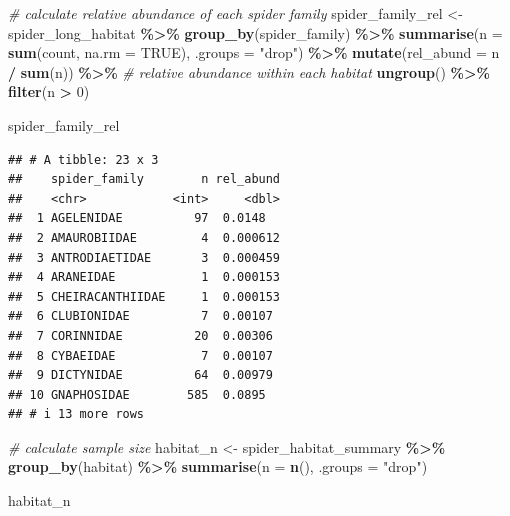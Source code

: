 \documentclass[
]{article}
\newenvironment{Shaded}{\begin{snugshade}}{\end{snugshade}}
\newcommand{\AttributeTok}[1]{\textcolor[rgb]{0.13,0.29,0.53}{#1}}
\newcommand{\CommentTok}[1]{\textcolor[rgb]{0.56,0.35,0.01}{\textit{#1}}}
\newcommand{\ConstantTok}[1]{\textcolor[rgb]{0.56,0.35,0.01}{#1}}
\newcommand{\DecValTok}[1]{\textcolor[rgb]{0.00,0.00,0.81}{#1}}
\newcommand{\FunctionTok}[1]{\textcolor[rgb]{0.13,0.29,0.53}{\textbf{#1}}}
\newcommand{\NormalTok}[1]{#1}
\newcommand{\OtherTok}[1]{\textcolor[rgb]{0.56,0.35,0.01}{#1}}
\newcommand{\SpecialCharTok}[1]{\textcolor[rgb]{0.81,0.36,0.00}{\textbf{#1}}}
\newcommand{\StringTok}[1]{\textcolor[rgb]{0.31,0.60,0.02}{#1}}
\begin{document}
\begin{Shaded}
\begin{Highlighting}[]
\CommentTok{\# calculate relative abundance of each spider family}
\NormalTok{spider\_family\_rel }\OtherTok{\textless{}{-}}\NormalTok{ spider\_long\_habitat }\SpecialCharTok{\%\textgreater{}\%}
  \FunctionTok{group\_by}\NormalTok{(spider\_family) }\SpecialCharTok{\%\textgreater{}\%}
  \FunctionTok{summarise}\NormalTok{(}\AttributeTok{n =} \FunctionTok{sum}\NormalTok{(count, }\AttributeTok{na.rm =} \ConstantTok{TRUE}\NormalTok{), }\AttributeTok{.groups =} \StringTok{"drop"}\NormalTok{) }\SpecialCharTok{\%\textgreater{}\%}
  \FunctionTok{mutate}\NormalTok{(}\AttributeTok{rel\_abund =}\NormalTok{ n }\SpecialCharTok{/} \FunctionTok{sum}\NormalTok{(n)) }\SpecialCharTok{\%\textgreater{}\%}   \CommentTok{\# relative abundance within each habitat}
  \FunctionTok{ungroup}\NormalTok{() }\SpecialCharTok{\%\textgreater{}\%}
  \FunctionTok{filter}\NormalTok{(n }\SpecialCharTok{\textgreater{}} \DecValTok{0}\NormalTok{)}

\NormalTok{spider\_family\_rel}
\end{Highlighting}
\end{Shaded}

\begin{verbatim}
## # A tibble: 23 x 3
##    spider_family        n rel_abund
##    <chr>            <int>     <dbl>
##  1 AGELENIDAE          97  0.0148  
##  2 AMAUROBIIDAE         4  0.000612
##  3 ANTRODIAETIDAE       3  0.000459
##  4 ARANEIDAE            1  0.000153
##  5 CHEIRACANTHIIDAE     1  0.000153
##  6 CLUBIONIDAE          7  0.00107 
##  7 CORINNIDAE          20  0.00306 
##  8 CYBAEIDAE            7  0.00107 
##  9 DICTYNIDAE          64  0.00979 
## 10 GNAPHOSIDAE        585  0.0895  
## # i 13 more rows
\end{verbatim}

\begin{Shaded}
\begin{Highlighting}[]
\CommentTok{\# calculate sample size}
\NormalTok{habitat\_n }\OtherTok{\textless{}{-}}\NormalTok{ spider\_habitat\_summary }\SpecialCharTok{\%\textgreater{}\%}
  \FunctionTok{group\_by}\NormalTok{(habitat) }\SpecialCharTok{\%\textgreater{}\%}
  \FunctionTok{summarise}\NormalTok{(}\AttributeTok{n =} \FunctionTok{n}\NormalTok{(), }\AttributeTok{.groups =} \StringTok{"drop"}\NormalTok{)}

\NormalTok{habitat\_n}
\end{Highlighting}
\end{Shaded}
\end{document}

